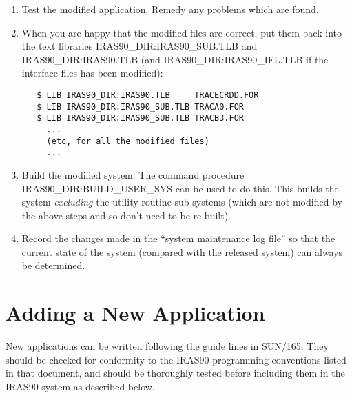 \begin{enumerate}
\item Test the modified application. Remedy any problems which are found.

\item When you are happy that the modified files are correct, put them back into
the text libraries {\small IRAS90\_DIR:IRAS90\_SUB.TLB} and {\small
IRAS90\_DIR:IRAS90.TLB} (and {\small IRAS90\_DIR:IRAS90\_IFL.TLB} if the interface
files has been modified): 

\small 
\begin{verbatim}
   $ LIB IRAS90_DIR:IRAS90.TLB     TRACECRDD.FOR
   $ LIB IRAS90_DIR:IRAS90_SUB.TLB TRACA0.FOR
   $ LIB IRAS90_DIR:IRAS90_SUB.TLB TRACB3.FOR
     ...
     (etc, for all the modified files)
     ...
\end{verbatim}
\normalsize

\item Build the modified system. The command procedure {\small
IRAS90\_DIR:BUILD\_USER\_SYS} can be used to do this. This builds the system
{\em excluding} the utility routine sub-systems (which are not modified by the
above steps and so don't need to be re-built). 

\item Record the changes made in the ``system maintenance log file'' so that the
current state of the system (compared with the released system) can 
always be determined.

\end{enumerate}

\section{Adding a New Application}
New applications can be written following the guide lines in SUN/165. They
should be checked for conformity to the {\small IRAS90} programming conventions
listed in that document, and should be thoroughly tested before including them
in the {\small IRAS90} system as described below. 


